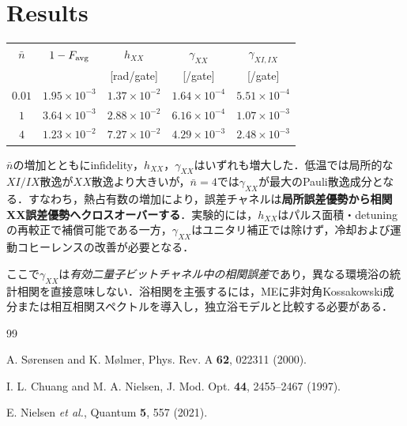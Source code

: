 \documentclass[dvipdfmx,a4paper,10pt,twocolumn]{jsarticle}
\begin{document}
\newpage
\section{Results}

\begin{center}
\small
\setlength{\tabcolsep}{3.4pt}
\renewcommand{\arraystretch}{1.08}
\begin{tabular}{c|c|c|c|c}
\hline
$\bar n$ & $1-F_{\rm avg}$ & $h_{XX}$ & $\gamma_{XX}$ & $\gamma_{XI,IX}$ \\
 &  & [rad/gate] & [/gate] & [/gate] \\
\hline
$0.01$ & $1.95\!\times\!10^{-3}$ & $1.37\!\times\!10^{-2}$ & $1.64\!\times\!10^{-4}$ & $5.51\!\times\!10^{-4}$ \\
$1$    & $3.64\!\times\!10^{-3}$ & $2.88\!\times\!10^{-2}$ & $6.16\!\times\!10^{-4}$ & $1.07\!\times\!10^{-3}$ \\
$4$    & $1.23\!\times\!10^{-2}$ & $7.27\!\times\!10^{-2}$ & $4.29\!\times\!10^{-3}$ & $2.48\!\times\!10^{-3}$ \\
\hline
\end{tabular}
\end{center}

$\bar n$の増加とともにinfidelity，$h_{XX}$，$\gamma_{XX}$はいずれも増大した．低温では局所的な$XI/IX$散逸が$XX$散逸より大きいが，$\bar n=4$では$\gamma_{XX}$が最大のPauli散逸成分となる．すなわち，熱占有数の増加により，誤差チャネルは\textbf{局所誤差優勢から相関XX誤差優勢へクロスオーバーする}．実験的には，$h_{XX}$はパルス面積・detuningの再較正で補償可能である一方，$\gamma_{XX}$はユニタリ補正では除けず，冷却および運動コヒーレンスの改善が必要となる．

ここで$\gamma_{XX}$は\emph{有効二量子ビットチャネル中の相関誤差}であり，異なる環境浴の統計相関を直接意味しない．浴相関を主張するには，MEに非対角Kossakowski成分または相互相関スペクトルを導入し，独立浴モデルと比較する必要がある．

\begin{thebibliography}{99}
\small

A. S{\o}rensen and K. M{\o}lmer,
Phys. Rev. A \textbf{62}, 022311 (2000).

I. L. Chuang and M. A. Nielsen,
J. Mod. Opt. \textbf{44}, 2455--2467 (1997).

E. Nielsen \textit{et al.},
Quantum \textbf{5}, 557 (2021).

\end{thebibliography}
\end{document}
